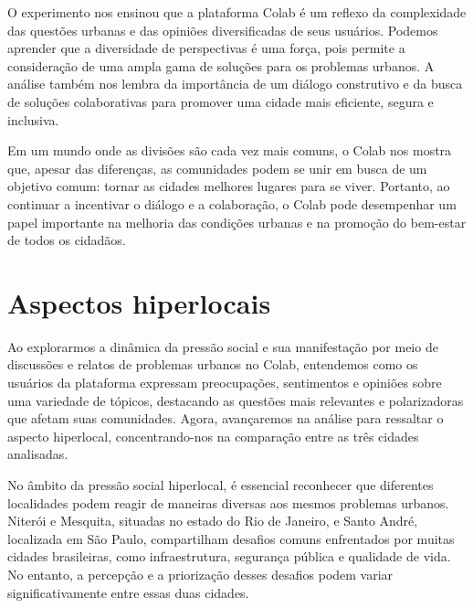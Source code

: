 O experimento nos ensinou que a plataforma Colab é um reflexo da complexidade das questões urbanas e das opiniões diversificadas de seus usuários. Podemos aprender que a diversidade de perspectivas é uma força, pois permite a consideração de uma ampla gama de soluções para os problemas urbanos. A análise também nos lembra da importância de um diálogo construtivo e da busca de soluções colaborativas para promover uma cidade mais eficiente, segura e inclusiva.

Em um mundo onde as divisões são cada vez mais comuns, o Colab nos mostra que, apesar das diferenças, as comunidades podem se unir em busca de um objetivo comum: tornar as cidades melhores lugares para se viver. Portanto, ao continuar a incentivar o diálogo e a colaboração, o Colab pode desempenhar um papel importante na melhoria das condições urbanas e na promoção do bem-estar de todos os cidadãos.

\section{Aspectos hiperlocais}

Ao explorarmos a dinâmica da pressão social e sua manifestação por meio de discussões e relatos de problemas urbanos no Colab, entendemos como os usuários da plataforma expressam preocupações, sentimentos e opiniões sobre uma variedade de tópicos, destacando as questões mais relevantes e polarizadoras que afetam suas comunidades. Agora, avançaremos na análise para ressaltar o aspecto hiperlocal, concentrando-nos na comparação entre as três cidades analisadas.

No âmbito da pressão social hiperlocal, é essencial reconhecer que diferentes localidades podem reagir de maneiras diversas aos mesmos problemas urbanos. Niterói e Mesquita, situadas no estado do Rio de Janeiro, e Santo André, localizada em São Paulo, compartilham desafios comuns enfrentados por muitas cidades brasileiras, como infraestrutura, segurança pública e qualidade de vida. No entanto, a percepção e a priorização desses desafios podem variar significativamente entre essas duas cidades.

